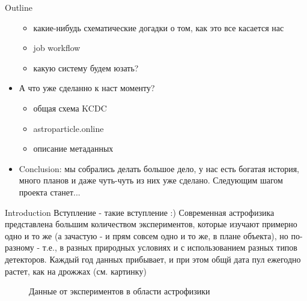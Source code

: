 \documentclass[18pt]{beamer}
\begin{document}
\begin{frame}[allowframebreaks]{Outline}
\begin{itemize}
\begin{itemize}
        \item какие-нибудь схематические догадки о том, как это все касается нас
        \item job workflow
        \item какую систему будем юзать?
\end{itemize}
\item А что уже сделанно к наст моменту?
    \begin{itemize}
     \item общая схема KCDC
     \item astroparticle.online
     \item описание метаданных
    \end{itemize}
\item Conclusion: мы собрались делать большое дело, у нас есть богатая история, много планов и даже чуть-чуть из них уже сделано. Следующим шагом проекта станет...
\end{itemize}

\end{frame}

\begin{frame}{Introduction}
Вступление - такие вступление :)
Современная астрофизика представлена большим количеством экспериментов, которые изучают примерно одно и то же (а зачастую - и прям совсем одно и то же, в плане объекта), но по-разному - т.е., в разных природных условиях и с использованием разных типов детекторов.
Каждый год данных прибывает, и при этом общй дата пул ежегодно растет, как на дрожжах (см. картинку)

\begin{figure}[h]
\caption{Данные от экспериментов в области астрофизики}
\label{ris:image}
\end{figure}

\end{frame}
\end{document}
